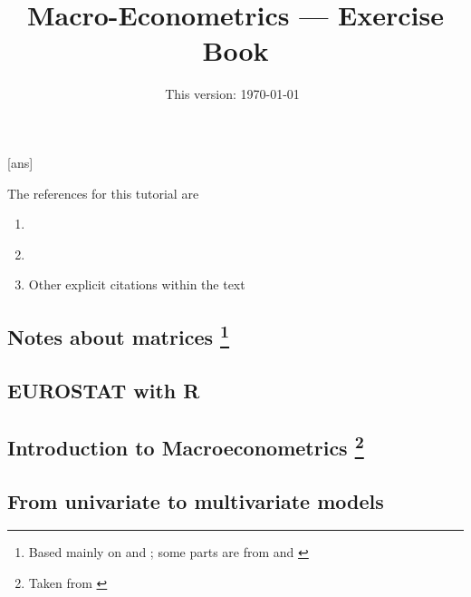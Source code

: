 \documentclass[11pt]{article}
\begin{document}
[ans]

\title{Macro-Econometrics --- Exercise Book}

\author{}

\date{This version: \today ~\currenttime}

\maketitle

The references for this tutorial are
\begin{enumerate}[label=\roman*.]
    \item \cite{MartinHurnHarris-2012}
    \item \cite{Mutschler-2018-github_repo}
    \item Other explicit citations within the text
\end{enumerate}

\subsection{Notes about matrices\texorpdfstring{%
        \protect\footnote{Based mainly on \cite{MagnusNeudecker-2019-part1} and \cite{MagnusNeudecker-2019-part2}; some parts are from \cite[][]{Hamilton-1994} and \cite[][]{Mutschler-2018-github_repo}}%
    }{}}


\subsection{EUROSTAT with R}


\subsection{Introduction to Macroeconometrics\texorpdfstring{%
        \protect\footnote{Taken from \cite[][see the section no 1, titled ``Macroeconometrics''.]{Mutschler-2018-github_repo}}%
    }{}}


\subsection{From univariate to multivariate models}

\end{document}
